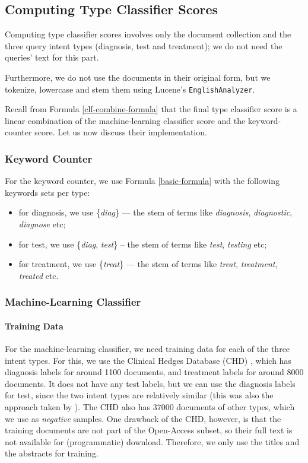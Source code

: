 \subsection{Computing Type Classifier Scores}
Computing type classifier scores involves only the document collection and the three query intent types (diagnosis, test and treatment);
we do not need the queries' text for this part.

Furthermore, we do not use the documents in their original form,
but we tokenize, lowercase and stem them using Lucene's \texttt{EnglishAnalyzer}.

Recall from Formula \ref{clf-combine-formula} that the final type classifier score is a linear combination of the
machine-learning classifier score and the keyword-counter score. Let us now discuss their implementation.

\subsubsection{Keyword Counter}
For the keyword counter, we use Formula \ref{basic-formula} with the following keywords sets per type:
\begin{itemize}
 \item for diagnosis, we use \{\emph{diag}\} --- the stem of terms like \emph{diagnosis}, \emph{diagnostic}, \emph{diagnose} etc;
 \item for test, we use \{\emph{diag}, \emph{test}\} -- the stem of terms like \emph{test}, \emph{testing} etc;
 \item for treatment, we use \{\emph{treat}\} --- the stem of terms like \emph{treat}, \emph{treatment}, \emph{treated} etc.
\end{itemize}

\subsubsection{Machine-Learning Classifier}
\paragraph{Training Data}
For the machine-learning classifier, we need training data for each of the three intent types. For this, we use the Clinical Hedges Database (CHD)
\cite{chd},
which has diagnosis labels for around 1100 documents, and treatment labels for around 8000 documents. It does
not have any test labels, but we can use the diagnosis labels for test, since the two intent types are relatively similar
(this was also the approach taken by \cite{choi}).
The CHD also has 37000 documents of other types, which we use as \emph{negative} samples.
One drawback of the CHD, however, is that the training documents are not part of the Open-Access subset, so their full text is not
available for (programmatic) download. Therefore, we only use the titles and the abstracts for training.

